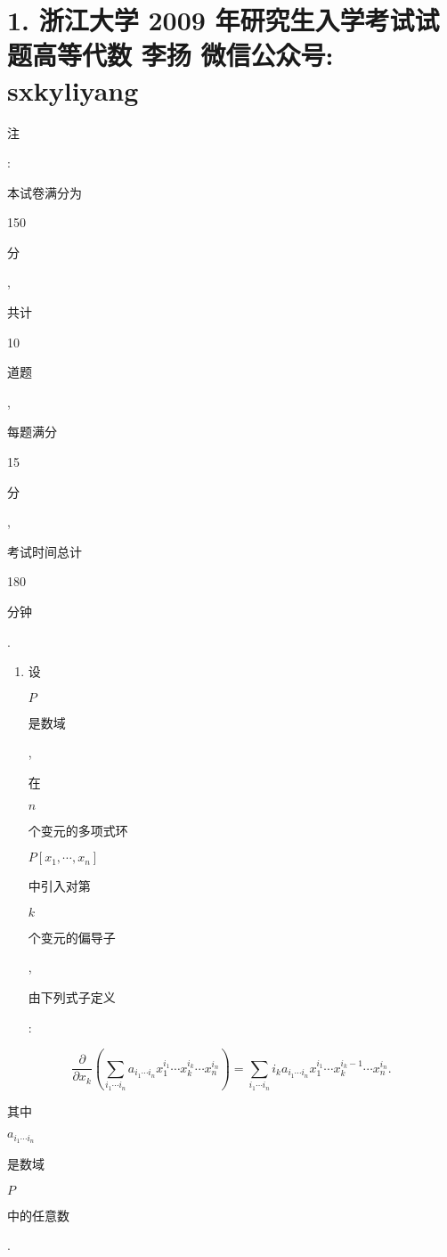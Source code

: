 \documentclass[10pt]{article}
\begin{document}
\section{1. 浙江大学 2009 年研究生入学考试试题高等代数 
 李扬 
 微信公众号: sxkyliyang}
\begin{CJK}{UTF8}{mj}注\end{CJK}: \begin{CJK}{UTF8}{mj}本试卷满分为\end{CJK} 150 \begin{CJK}{UTF8}{mj}分\end{CJK}, \begin{CJK}{UTF8}{mj}共计\end{CJK} 10 \begin{CJK}{UTF8}{mj}道题\end{CJK}, \begin{CJK}{UTF8}{mj}每题满分\end{CJK} 15 \begin{CJK}{UTF8}{mj}分\end{CJK}, \begin{CJK}{UTF8}{mj}考试时间总计\end{CJK} 180 \begin{CJK}{UTF8}{mj}分钟\end{CJK}.

\begin{enumerate}
  \item \begin{CJK}{UTF8}{mj}设\end{CJK} $P$ \begin{CJK}{UTF8}{mj}是数域\end{CJK}, \begin{CJK}{UTF8}{mj}在\end{CJK} $n$ \begin{CJK}{UTF8}{mj}个变元的多项式环\end{CJK} $P\left[x_{1}, \cdots, x_{n}\right]$ \begin{CJK}{UTF8}{mj}中引入对第\end{CJK} $k$ \begin{CJK}{UTF8}{mj}个变元的偏导子\end{CJK}, \begin{CJK}{UTF8}{mj}由下列式子定义\end{CJK}:
\end{enumerate}
$$
\frac{\partial}{\partial x_{k}}\left(\sum_{i_{1} \cdots i_{n}} a_{i_{1} \cdots i_{n}} x_{1}^{i_{1}} \cdots x_{k}^{i_{k}} \cdots x_{n}^{i_{n}}\right)=\sum_{i_{1} \cdots i_{n}} i_{k} a_{i_{1} \cdots i_{n}} x_{1}^{i_{1}} \cdots x_{k}^{i_{k}-1} \cdots x_{n}^{i_{n}} .
$$
\begin{CJK}{UTF8}{mj}其中\end{CJK} $a_{i_{1} \cdots i_{n}}$ \begin{CJK}{UTF8}{mj}是数域\end{CJK} $P$ \begin{CJK}{UTF8}{mj}中的任意数\end{CJK}.
\end{document}

